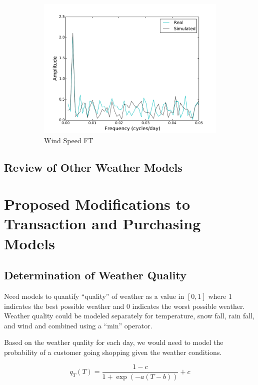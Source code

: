\documentclass[11pt, letterpaper]{article}
\begin{document}
\begin{figure}[H]
\begin{subfigure}[b]{0.45\textwidth}
    \includegraphics[width=\textwidth]{figures/daily_wind_speed_fft.pdf}
    \caption{Wind Speed FT}
  \end{subfigure}
  
  \label{fig:analysis}
  \caption{}
\end{figure}


\subsection{Review of Other Weather Models}

\newpage
\section{Proposed Modifications to Transaction and Purchasing Models}

\subsection{Determination of Weather Quality}

Need models to quantify ``quality'' of weather as a value in $[0, 1]$ where 1 indicates the best possible weather and 0 indicates the worst possible weather.  Weather quality could be modeled separately for temperature, snow fall, rain fall, and wind and combined using a ``min'' operator.   

Based on the weather quality for each day, we would need to model the probability of a customer going shopping given the weather conditions.

\begin{equation}
q_T(T) = \frac{1 - c}{1 + \exp(-a (T - b))} + c
\end{equation}
\end{document}
